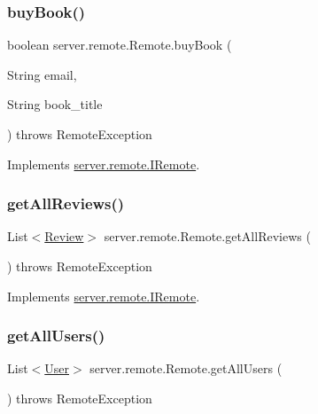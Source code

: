 \subsubsection{\texorpdfstring{buy\+Book()}{buyBook()}}
{\footnotesize\ttfamily boolean server.\+remote.\+Remote.\+buy\+Book (\begin{DoxyParamCaption}\item[{String}]{email,  }\item[{String}]{book\+\_\+title }\end{DoxyParamCaption}) throws Remote\+Exception}



Implements \hyperlink{interfaceserver_1_1remote_1_1_i_remote_a5ecb918e7d2650346770f3ff5676c25b}{server.\+remote.\+I\+Remote}.

\mbox{\label{classserver_1_1remote_1_1_remote_a22538e64b45f5f93237b455100243b44}} 
\subsubsection{\texorpdfstring{get\+All\+Reviews()}{getAllReviews()}}
{\footnotesize\ttfamily List$<$\hyperlink{classserver_1_1data_1_1_review}{Review}$>$ server.\+remote.\+Remote.\+get\+All\+Reviews (\begin{DoxyParamCaption}{ }\end{DoxyParamCaption}) throws Remote\+Exception}



Implements \hyperlink{interfaceserver_1_1remote_1_1_i_remote_a017e07cb93ae582188c20d7b1ce6b014}{server.\+remote.\+I\+Remote}.

\mbox{\label{classserver_1_1remote_1_1_remote_a3d41acc8ab7328be2082573542758f07}} 
\subsubsection{\texorpdfstring{get\+All\+Users()}{getAllUsers()}}
{\footnotesize\ttfamily List$<$\hyperlink{classserver_1_1data_1_1_user}{User}$>$ server.\+remote.\+Remote.\+get\+All\+Users (\begin{DoxyParamCaption}{ }\end{DoxyParamCaption}) throws Remote\+Exception}



